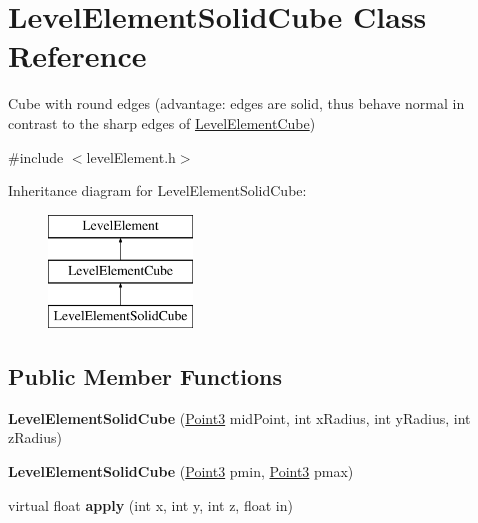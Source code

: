 \hypertarget{classLevelElementSolidCube}{
\section{\-Level\-Element\-Solid\-Cube \-Class \-Reference}
\label{d3/dfb/classLevelElementSolidCube}
}


\-Cube with round edges (advantage\-: edges are solid, thus behave normal in contrast to the sharp edges of \hyperlink{classLevelElementCube}{\-Level\-Element\-Cube})  




{\ttfamily \#include $<$level\-Element.\-h$>$}

\-Inheritance diagram for \-Level\-Element\-Solid\-Cube\-:\begin{figure}[H]
\begin{center}
\leavevmode
\includegraphics[height=3.000000cm]{d3/dfb/classLevelElementSolidCube}
\end{center}
\end{figure}
\subsection*{\-Public \-Member \-Functions}
\begin{DoxyCompactItemize}
\item 
\hypertarget{classLevelElementSolidCube_a7fd53dd49e46b0740e2d4b20d5a3240e}{
{\bfseries \-Level\-Element\-Solid\-Cube} (\hyperlink{classPoint3}{\-Point3} mid\-Point, int x\-Radius, int y\-Radius, int z\-Radius)}
\label{d3/dfb/classLevelElementSolidCube_a7fd53dd49e46b0740e2d4b20d5a3240e}

\item 
\hypertarget{classLevelElementSolidCube_a90f4119ac2ab6ffe0b028213f4ee3c6a}{
{\bfseries \-Level\-Element\-Solid\-Cube} (\hyperlink{classPoint3}{\-Point3} pmin, \hyperlink{classPoint3}{\-Point3} pmax)}
\label{d3/dfb/classLevelElementSolidCube_a90f4119ac2ab6ffe0b028213f4ee3c6a}

\item 
\hypertarget{classLevelElementSolidCube_ab97edc8728226d6f4c09225f4d69999e}{
virtual float {\bfseries apply} (int x, int y, int z, float in)}
\label{d3/dfb/classLevelElementSolidCube_ab97edc8728226d6f4c09225f4d69999e}

\end{DoxyCompactItemize}


